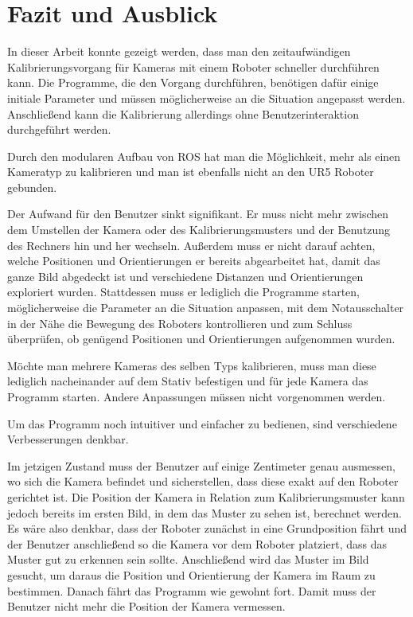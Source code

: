 \chapter{Fazit und Ausblick}
\label{chap:fazit_und_ausblick}
In dieser Arbeit konnte gezeigt werden, dass man den zeitaufwändigen Kalibrierungsvorgang für Kameras mit einem Roboter schneller durchführen kann. Die Programme, die den Vorgang durchführen, benötigen dafür einige initiale Parameter und müssen möglicherweise an die Situation angepasst werden. Anschließend kann die Kalibrierung allerdings ohne Benutzerinteraktion durchgeführt werden.

Durch den modularen Aufbau von ROS hat man die Möglichkeit, mehr als einen Kameratyp zu kalibrieren und man ist ebenfalls nicht an den UR5 Roboter gebunden. 

Der Aufwand für den Benutzer sinkt signifikant. Er muss nicht mehr zwischen dem Umstellen der Kamera oder des Kalibrierungsmusters und der Benutzung des Rechners hin und her wechseln. Außerdem muss er nicht darauf achten, welche Positionen und Orientierungen er bereits abgearbeitet hat, damit das ganze Bild abgedeckt ist und verschiedene Distanzen und Orientierungen exploriert wurden. Stattdessen muss er lediglich die Programme starten, möglicherweise die Parameter an die Situation anpassen, mit dem Notausschalter in der Nähe die Bewegung des Roboters kontrollieren und zum Schluss überprüfen, ob genügend Positionen und Orientierungen aufgenommen wurden.

Möchte man mehrere Kameras des selben Typs kalibrieren, muss man diese lediglich nacheinander auf dem Stativ befestigen und für jede Kamera das Programm starten. Andere Anpassungen müssen nicht vorgenommen werden.

Um das Programm noch intuitiver und einfacher zu bedienen, sind verschiedene Verbesserungen denkbar.

Im jetzigen Zustand muss der Benutzer auf einige Zentimeter genau ausmessen, wo sich die Kamera befindet und sicherstellen, dass diese exakt auf den Roboter gerichtet ist. Die Position der Kamera in Relation zum Kalibrierungsmuster kann jedoch bereits im ersten Bild, in dem das Muster zu sehen ist, berechnet werden. Es wäre also denkbar, dass der Roboter zunächst in eine Grundposition fährt und der Benutzer anschließend so die Kamera vor dem Roboter platziert, dass das Muster gut zu erkennen sein sollte. Anschließend wird das Muster im Bild gesucht, um daraus die Position und Orientierung der Kamera im Raum zu bestimmen. Danach fährt das Programm wie gewohnt fort. Damit muss der Benutzer nicht mehr die Position der Kamera vermessen.

